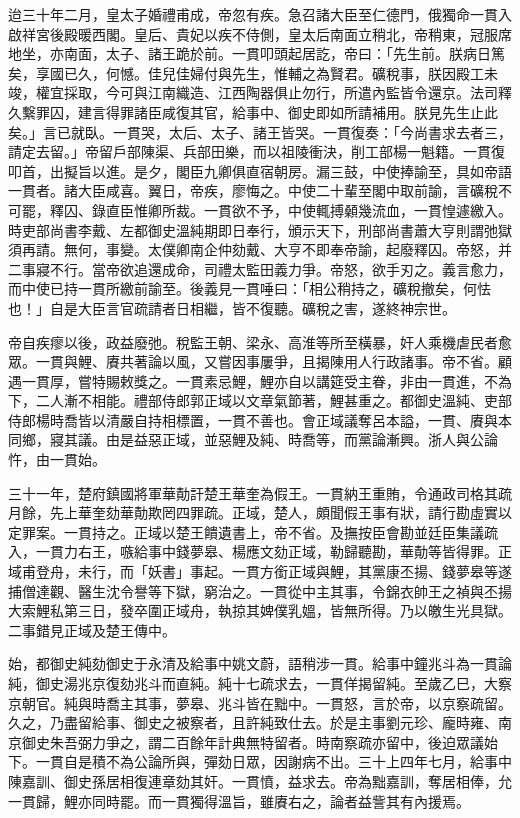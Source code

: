 \begin{pinyinscope}
迨三十年二月，皇太子婚禮甫成，帝忽有疾。急召諸大臣至仁德門，俄獨命一貫入啟祥宮後殿暖西閣。皇后、貴妃以疾不侍側，皇太后南面立稍北，帝稍東，冠服席地坐，亦南面，太子、諸王跪於前。一貫叩頭起居訖，帝曰：「先生前。朕病日篤矣，享國已久，何憾。佳兒佳婦付與先生，惟輔之為賢君。礦稅事，朕因殿工未竣，權宜採取，今可與江南織造、江西陶器俱止勿行，所遣內監皆令還京。法司釋久繫罪囚，建言得罪諸臣咸復其官，給事中、御史即如所請補用。朕見先生止此矣。」言已就臥。一貫哭，太后、太子、諸王皆哭。一貫復奏：「今尚書求去者三，請定去留。」帝留戶部陳渠、兵部田樂，而以祖陵衝決，削工部楊一魁籍。一貫復叩首，出擬旨以進。是夕，閣臣九卿俱直宿朝房。漏三鼓，中使捧諭至，具如帝語一貫者。諸大臣咸喜。翼日，帝疾，廖悔之。中使二十輩至閣中取前諭，言礦稅不可罷，釋囚、錄直臣惟卿所裁。一貫欲不予，中使輒搏顙幾流血，一貫惶遽繳入。時吏部尚書李戴、左都御史溫純期即日奉行，頒示天下，刑部尚書蕭大亨則謂弛獄須再請。無何，事變。太僕卿南企仲劾戴、大亨不即奉帝諭，起廢釋囚。帝怒，并二事寢不行。當帝欲追還成命，司禮太監田義力爭。帝怒，欲手刃之。義言愈力，而中使已持一貫所繳前諭至。後義見一貫唾曰：「相公稍持之，礦稅撤矣，何怯也！」自是大臣言官疏請者日相繼，皆不復聽。礦稅之害，遂終神宗世。

帝自疾瘳以後，政益廢弛。稅監王朝、梁永、高淮等所至橫暴，奸人乘機虐民者愈眾。一貫與鯉、賡共著論以風，又嘗因事屢爭，且揭陳用人行政諸事。帝不省。顧遇一貫厚，嘗特賜敕獎之。一貫素忌鯉，鯉亦自以講筵受主眷，非由一貫進，不為下，二人漸不相能。禮部侍郎郭正域以文章氣節著，鯉甚重之。都御史溫純、吏部侍郎楊時喬皆以清嚴自持相標置，一貫不善也。會正域議奪呂本謚，一貫、賡與本同鄉，寢其議。由是益惡正域，並惡鯉及純、時喬等，而黨論漸興。浙人與公論忤，由一貫始。

三十一年，楚府鎮國將軍華勣訐楚王華奎為假王。一貫納王重賄，令通政司格其疏月餘，先上華奎劾華勣欺罔四罪疏。正域，楚人，頗聞假王事有狀，請行勘虛實以定罪案。一貫持之。正域以楚王饋遺書上，帝不省。及撫按臣會勘並廷臣集議疏入，一貫力右王，嗾給事中錢夢皋、楊應文劾正域，勒歸聽勘，華勣等皆得罪。正域甫登舟，未行，而「妖書」事起。一貫方銜正域與鯉，其黨康丕揚、錢夢皋等遂捕僧達觀、醫生沈令譽等下獄，窮治之。一貫從中主其事，令錦衣帥王之禎與丕揚大索鯉私第三日，發卒圍正域舟，執掠其婢僕乳媼，皆無所得。乃以皦生光具獄。二事錯見正域及楚王傳中。

始，都御史純劾御史于永清及給事中姚文蔚，語稍涉一貫。給事中鐘兆斗為一貫論純，御史湯兆京復劾兆斗而直純。純十七疏求去，一貫佯揭留純。至歲乙巳，大察京朝官。純與時喬主其事，夢皋、兆斗皆在黜中。一貫怒，言於帝，以京察疏留。久之，乃盡留給事、御史之被察者，且許純致仕去。於是主事劉元珍、龐時雍、南京御史朱吾弼力爭之，謂二百餘年計典無特留者。時南察疏亦留中，後迫眾議始下。一貫自是積不為公論所與，彈劾日眾，因謝病不出。三十上四年七月，給事中陳嘉訓、御史孫居相復連章劾其奸。一貫憤，益求去。帝為黜嘉訓，奪居相俸，允一貫歸，鯉亦同時罷。而一貫獨得溫旨，雖賡右之，論者益訾其有內援焉。


\end{pinyinscope}
